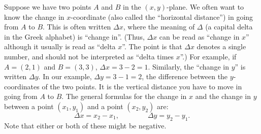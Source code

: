 Suppose we have two points $A$ and $B$ in the $(x,y)$-plane.
We often want to know the change in $x$-coordinate (also called the
``horizontal distance'') in going from $A$ to $B$.  This is often
written $\Delta x$, where the meaning of $\Delta$ (a capital delta in
the Greek alphabet) is ``change in''. (Thus, $\Delta x$ can be read as
``change in $x$'' although it usually is read as ``delta $x$''. The
point is that $\Delta x$ denotes a single number, and should not be
interpreted as ``delta times $x$''.)  
For example, if $A=(2,1)$ and $B=(3,3)$, $\Delta
x=3-2=1$.  Similarly, the ``change in $y$'' is written $\Delta y$.  In
our example, $\Delta y= 3-1=2$, the difference between the
$y$-coordinates of the two points.  It is the vertical distance you
have to move in going from $A$ to $B$.  The general formulas for the
change in $x$ and the change in $y$ between a point $(x_1,y_1)$ and a
point $(x_2,y_2)$ are:
$$
\Delta x=x_2-x_1,\qquad\qquad\Delta y=y_2-y_1.
$$
Note that either or both of these might be negative.





